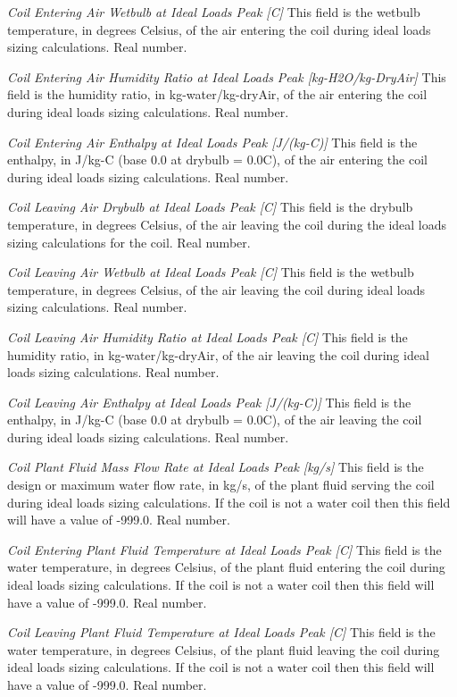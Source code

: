 \emph{Coil Entering Air Wetbulb at Ideal Loads Peak [C]}  This field is the wetbulb temperature, in degrees Celsius, of the air entering the coil during ideal loads sizing calculations.  Real number.

\emph{Coil Entering Air Humidity Ratio at Ideal Loads Peak [kg-H2O/kg-DryAir]}  This field is the humidity ratio, in kg-water/kg-dryAir, of the air entering the coil during ideal loads sizing calculations. Real number.

\emph{Coil Entering Air Enthalpy at Ideal Loads Peak [J/(kg-C)]}  This field is the enthalpy, in J/kg-C (base 0.0 at drybulb = 0.0C), of the air entering the coil during ideal loads sizing calculations. Real number.

\emph{Coil Leaving Air Drybulb at Ideal Loads Peak [C]}  This field is the drybulb temperature, in degrees Celsius, of the air leaving the coil during the ideal loads sizing calculations for the coil.  Real number.

\emph{Coil Leaving Air Wetbulb at Ideal Loads Peak [C]}  This field is the wetbulb temperature, in degrees Celsius, of the air leaving the coil during ideal loads sizing calculations. Real number.

\emph{Coil Leaving Air Humidity Ratio at Ideal Loads Peak [C]}  This field is the humidity ratio, in kg-water/kg-dryAir, of the air leaving the coil during ideal loads sizing calculations. Real number.

\emph{Coil Leaving Air Enthalpy at Ideal Loads Peak [J/(kg-C)]}  This field is the enthalpy, in J/kg-C (base 0.0 at drybulb = 0.0C), of the air leaving the coil during ideal loads sizing calculations. Real number.

\emph{Coil Plant Fluid Mass Flow Rate at Ideal Loads Peak [kg/s]}  This field is the design or maximum water flow rate, in kg/s, of the plant fluid serving the coil during ideal loads sizing calculations.  If the coil is not a water coil then this field will have a value of -999.0. Real number.

\emph{Coil Entering Plant Fluid Temperature at Ideal Loads Peak [C]}  This field is the water temperature, in degrees Celsius, of the plant fluid entering the coil during ideal loads sizing calculations.  If the coil is not a water coil then this field will have a value of -999.0. Real number.

\emph{Coil Leaving Plant Fluid Temperature at Ideal Loads Peak [C]}  This field is the water temperature, in degrees Celsius, of the plant fluid leaving the coil during ideal loads sizing calculations.  If the coil is not a water coil then this field will have a value of -999.0. Real number.

